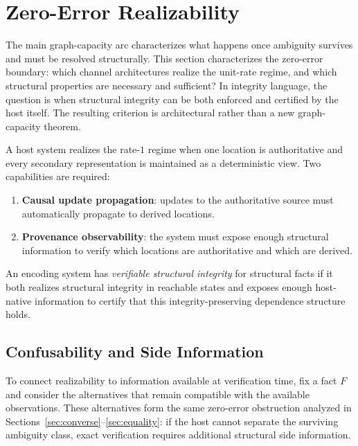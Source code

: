 \section{Zero-Error Realizability}\label{sec:requirements}

The main graph-capacity arc characterizes what happens once ambiguity survives and must be resolved structurally. This section characterizes the zero-error boundary: which channel architectures realize the unit-rate regime, and which structural properties are necessary and sufficient? In integrity language, the question is when structural integrity can be both enforced and certified by the host itself. The resulting criterion is architectural rather than a new graph-capacity theorem.

A host system realizes the rate-$1$ regime when one location is authoritative and every secondary representation is maintained as a deterministic view. Two capabilities are required:
\begin{enumerate}
\item \textbf{Causal update propagation}: updates to the authoritative source must automatically propagate to derived locations.
\item \textbf{Provenance observability}: the system must expose enough structural information to verify which locations are authoritative and which are derived.
\end{enumerate}

\begin{definition}\label{def:verifiable-integrity}
An encoding system has \emph{verifiable structural integrity} for structural facts if it both realizes structural integrity in reachable states and exposes enough host-native information to certify that this integrity-preserving dependence structure holds.
\end{definition}

\subsection{Confusability and Side Information}\label{sec:confusability}

To connect realizability to information available at verification time, fix a fact $F$ and consider the alternatives that remain compatible with the available observations. These alternatives form the same zero-error obstruction analyzed in Sections~\ref{sec:converse}--\ref{sec:equality}: if the host cannot separate the surviving ambiguity class, exact verification requires additional structural side information.

